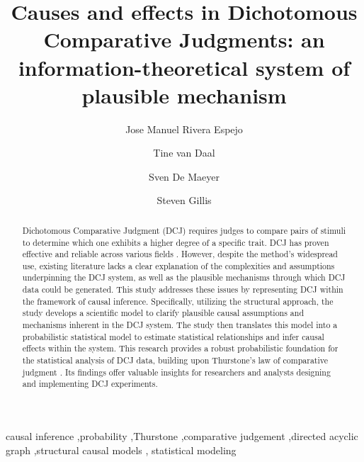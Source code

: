 \documentclass[
  authoryear,
  preprint,
  1p]{elsarticle}
\begin{document}
\begin{frontmatter}
\title{Causes and effects in Dichotomous Comparative Judgments: an
information-theoretical system of plausible mechanism}
\author[1]{Jose Manuel Rivera Espejo%
%
}
\author[1]{Tine van Daal%
%
}
\author[1]{Sven De Maeyer%
%
}
\author[2]{Steven Gillis%
%
}






        
\begin{abstract}
Dichotomous Comparative Judgment (DCJ) requires judges to compare pairs
of stimuli to determine which one exhibits a higher degree of a specific
trait. DCJ has proven effective and reliable across various fields
\citep{Pollitt_2012b, Jones_2015, vanDaal_et_al_2016, Bartholomew_et_al_2018, Lesterhuis_2018, Bartholomew_et_al_2020, Marshall_et_al_2020, Boonen_et_al_2020}.
However, despite the method's widespread use, existing literature lacks
a clear explanation of the complexities and assumptions underpinning the
DCJ system, as well as the plausible mechanisms through which DCJ data
could be generated. This study addresses these issues by representing
DCJ within the framework of causal inference. Specifically, utilizing
the structural approach, the study develops a scientific model to
clarify plausible causal assumptions and mechanisms inherent in the DCJ
system. The study then translates this model into a probabilistic
statistical model to estimate statistical relationships and infer causal
effects within the system. This research provides a robust probabilistic
foundation for the statistical analysis of DCJ data, building upon
Thurstone's law of comparative judgment \citeyearpar{Thurstone_1927}.
Its findings offer valuable insights for researchers and analysts
designing and implementing DCJ experiments.
\end{abstract}





\begin{keyword}
    causal inference \sep probability \sep Thurstone \sep comparative
judgement \sep directed acyclic graph \sep structural causal
models \sep 
    statistical modeling
\end{keyword}
\end{frontmatter}
    
\end{document}
